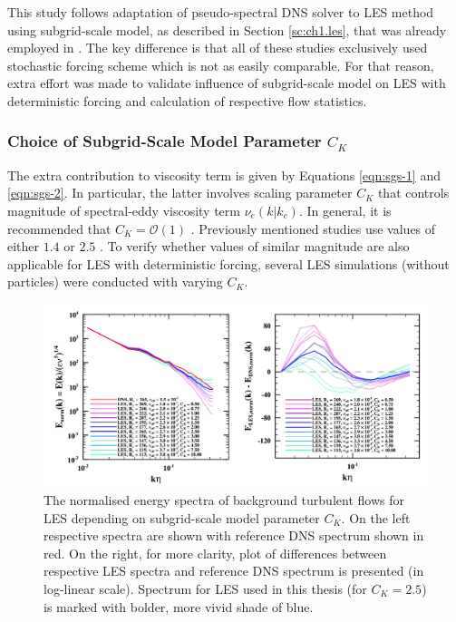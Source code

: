 \documentclass{pracamgren}
\begin{document}
This study follows adaptation of pseudo-spectral DNS solver to LES method using subgrid-scale model, as described in Section \ref{sc:ch1.les}, that was already employed in \textcite{Yang2008,Jin2010,Rosa2017}.
The key difference is that all of these studies exclusively used stochastic forcing scheme which is not as easily comparable.
For that reason, extra effort was made to validate influence of subgrid-scale model on LES with deterministic forcing and calculation of respective flow statistics.

\subsubsection{Choice of Subgrid-Scale Model Parameter $C_K$}

The extra contribution to viscosity term is given by Equations \ref{eqn:sgs-1} and \ref{eqn:sgs-2}.
In particular, the latter involves scaling parameter $C_K$ that controls magnitude of spectral-eddy viscosity term $\nu_{e}(k|k_c)$.
In general, it is recommended that $C_K = \mathcal{O}(1)$ \parencite{Chollet1981}.
Previously mentioned studies use values of either $1.4$ \parencite{Yang2008} or $2.5$ \parencite{Jin2010,Rosa2017}.
To verify whether values of similar magnitude are also applicable for LES with deterministic forcing, several LES simulations (without particles) were conducted with varying $C_K$.

\begin{figure}[h]
\centering
\includegraphics[width=13.5cm]{img/plots/C-sgsspec.pdf}
\caption{
The normalised energy spectra of background turbulent flows for LES depending on subgrid-scale model parameter $C_K$. 
On the left respective spectra are shown with reference DNS spectrum shown in red.
On the right, for more clarity, plot of differences between respective LES spectra and reference DNS spectrum is presented (in log-linear scale).
Spectrum for LES used in this thesis (for $C_K=2.5$) is marked with bolder, more vivid shade of blue.
}
\label{fig:sgsspec}
\end{figure}
\end{document}
